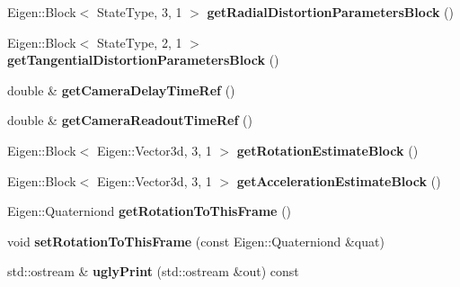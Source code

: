 \begin{DoxyCompactItemize}
\item 
\hypertarget{class_filter_state_aa326b846da2b55623e4d219d357e6b57}{Eigen\-::\-Block$<$ State\-Type, 3, 1 $>$ {\bfseries get\-Radial\-Distortion\-Parameters\-Block} ()}\label{class_filter_state_aa326b846da2b55623e4d219d357e6b57}

\item 
\hypertarget{class_filter_state_ad4b9c49509f2cc303c554969a8264c89}{Eigen\-::\-Block$<$ State\-Type, 2, 1 $>$ {\bfseries get\-Tangential\-Distortion\-Parameters\-Block} ()}\label{class_filter_state_ad4b9c49509f2cc303c554969a8264c89}

\item 
\hypertarget{class_filter_state_a6563a73bad1016317018c85d53380962}{double \& {\bfseries get\-Camera\-Delay\-Time\-Ref} ()}\label{class_filter_state_a6563a73bad1016317018c85d53380962}

\item 
\hypertarget{class_filter_state_ab9d3e7cad1ae09ed35bcc528c0e8ef45}{double \& {\bfseries get\-Camera\-Readout\-Time\-Ref} ()}\label{class_filter_state_ab9d3e7cad1ae09ed35bcc528c0e8ef45}

\item 
\hypertarget{class_filter_state_a928bd10a77b39859d6f108f8dd8ae0e9}{Eigen\-::\-Block$<$ Eigen\-::\-Vector3d, 3, 1 $>$ {\bfseries get\-Rotation\-Estimate\-Block} ()}\label{class_filter_state_a928bd10a77b39859d6f108f8dd8ae0e9}

\item 
\hypertarget{class_filter_state_a4436166f7dbaf6c002b6fc2832b4f136}{Eigen\-::\-Block$<$ Eigen\-::\-Vector3d, 3, 1 $>$ {\bfseries get\-Acceleration\-Estimate\-Block} ()}\label{class_filter_state_a4436166f7dbaf6c002b6fc2832b4f136}

\item 
\hypertarget{class_filter_state_ab3d02580cdbd89bc64276467d7c1c854}{Eigen\-::\-Quaterniond {\bfseries get\-Rotation\-To\-This\-Frame} ()}\label{class_filter_state_ab3d02580cdbd89bc64276467d7c1c854}

\item 
\hypertarget{class_filter_state_ae820e97a5a74c7765780bc7bb223796b}{void {\bfseries set\-Rotation\-To\-This\-Frame} (const Eigen\-::\-Quaterniond \&quat)}\label{class_filter_state_ae820e97a5a74c7765780bc7bb223796b}

\item 
\hypertarget{class_filter_state_aed4aab3a5133d37924bc5c1284b6cb66}{std\-::ostream \& {\bfseries ugly\-Print} (std\-::ostream \&out) const }\label{class_filter_state_aed4aab3a5133d37924bc5c1284b6cb66}


\end{DoxyCompactItemize}
